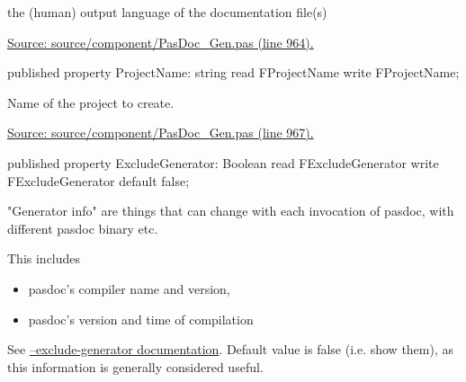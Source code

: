 \documentclass{report}
\newif\ifpdf
\begin{document}
\begin{list}{}
\begin{flushleft}
\ifpdf
\end{flushleft}
\fi


\par the (human) output language of the documentation file(s)\par
\href{https://github.com/pasdoc/pasdoc/blob/master/source/component/PasDoc_Gen.pas#L964}{Source: source/component/PasDoc{\_}Gen.pas (line 964).}\label{PasDoc_Gen.TDocGenerator-ProjectName}
\item[\textbf{ProjectName}\hfill]
\ifpdf
\begin{flushleft}
\fi
\begin{ttfamily}
published property ProjectName: string read FProjectName write FProjectName;\end{ttfamily}

\ifpdf
\end{flushleft}
\fi


\par Name of the project to create.\par
\href{https://github.com/pasdoc/pasdoc/blob/master/source/component/PasDoc_Gen.pas#L967}{Source: source/component/PasDoc{\_}Gen.pas (line 967).}\label{PasDoc_Gen.TDocGenerator-ExcludeGenerator}
\item[\textbf{ExcludeGenerator}\hfill]
\ifpdf
\begin{flushleft}
\fi
\begin{ttfamily}
published property ExcludeGenerator: Boolean
      read FExcludeGenerator write FExcludeGenerator default false;\end{ttfamily}

\ifpdf
\end{flushleft}
\fi


\par "Generator info" are things that can change with each invocation of pasdoc, with different pasdoc binary etc.

This includes \begin{itemize}
\item pasdoc's compiler name and version,
\item pasdoc's version and time of compilation
\end{itemize} See \href{https://pasdoc.github.io/ExcludeGeneratorOption}{--exclude-generator documentation}. Default value is false (i.e. show them), as this information is generally considered useful.


\end{list}
\end{document}
